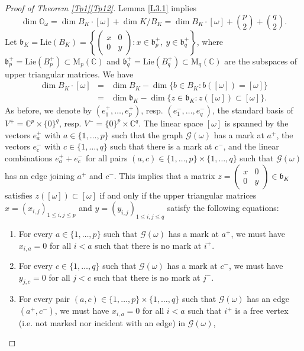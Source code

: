 \documentclass[11pt]{article}
\theoremstyle{definition}
\numberwithin{equation}{section}
\newcommand{\fb}{\mathfrak{b}}
\newcommand{\Mat}{\mathrm{M}}
\newcommand{\Xorbit}{\mathbb{O}}
\newcommand{\Lie}{\mathrm{Lie}}
\newcommand{\mC}{\mathbb{C}}
\begin{document}
\begin{proof}[Proof of Theorem \ref{Tp1}\ref{Tp12}]
Lemma \ref{L3.1} implies
\begin{equation}
\label{dim-1}
\dim\Xorbit_\omega=\dim B_K\cdot[\omega]+\dim K/B_K=\dim B_K\cdot[\omega]+\binom{p}{2}+\binom{q}{2}.
\end{equation}
Let $\fb_K=\Lie(B_K)=\left\{\begin{pmatrix} x & 0\\ 0 & y \end{pmatrix}:x\in\fb_p^+,\ y\in\fb_q^+\right\}$, where $\fb_p^+=\Lie(B_p^+)\subset\Mat_p(\mC)$ and $\fb_q^+=\Lie(B_q^+)\subset\Mat_q(\mC)$ are the subspaces of upper triangular matrices.
We have
\begin{eqnarray}
\dim B_K\cdot[\omega] & = & \dim B_K-\dim\{b\in B_K:b([\omega])=[\omega]\}  \label{dim-2}\\
 & = & \dim\fb_K-\dim\{z\in\fb_K:z([\omega])\subset[\omega]\}. \nonumber
\end{eqnarray}
As before, we denote by $(e_1^+,\ldots,e_p^+)$, resp. $(e_1^-,\ldots,e_q^-)$, the standard basis of $V^+=\mC^p\times\{0\}^q$, resp. $V^-=\{0\}^p\times\mC^q$.
The linear space $[\omega]$ is spanned by the vectors $e_a^+$ with $a\in\{1,\ldots,p\}$ such that the graph $\mathcal{G}(\omega)$ has a mark at $a^+$, the vectors $e_c^-$ with $c\in\{1,\ldots,q\}$ such that there is a mark at $c^-$, and the linear combinations $e_a^++e_c^-$ for all pairs $(a,c)\in\{1,\ldots,p\}\times\{1,\ldots,q\}$ such that $\mathcal{G}(\omega)$ has an edge joining $a^+$ and $c^-$.
This implies that a matrix $z=\begin{pmatrix} x & 0\\ 0 & y \end{pmatrix}\in\fb_K$
satisfies $z([\omega])\subset [\omega]$ if and only if the upper triangular matrices $x=(x_{i,j})_{1\leq i,j\leq p}$ and $y=(y_{i,j})_{1\leq i,j\leq q}$ satisfy the following equations:
\begin{enumerate}
\item For every $a\in\{1,\ldots,p\}$ such that $\mathcal{G}(\omega)$ has a mark at $a^+$, we must have $x_{i,a}=0$ for all $i<a$ such that there is no mark at $i^+$.
\item For every $c\in\{1,\ldots,q\}$ such that $\mathcal{G}(\omega)$ has a mark at $c^-$, we must have $y_{j,c}=0$ for all $j<c$ such that there is no mark at $j^-$.
\item For every pair $(a,c)\in\{1,\ldots,p\}\times\{1,\ldots,q\}$ such that $\mathcal{G}(\omega)$ has an edge $(a^+,c^-)$, we must have $x_{i,a}=0$ for all $i<a$ such that $i^+$ is a free vertex (i.e. not marked nor incident with an edge) in $\mathcal{G}(\omega)$,

\end{enumerate}
\end{proof}
\end{document}
